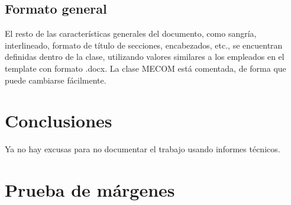 \documentclass[a4paper,11pt,twoside]{MECOM}
\begin{document}
    
    
    \subsection{Formato general}
    El resto de las caracter\'isticas generales del documento, como sangr\'ia, interlineado, formato de t\'itulo de secciones, encabezados, etc., se encuentran definidas dentro de la clase, utilizando valores similares a los empleados en el template con formato .docx. La clase MECOM est\'a comentada, de forma que puede cambiarse f\'acilmente.
    
    
    
    
    \section{Conclusiones}
    Ya no hay excusas para no documentar el trabajo usando informes t\'ecnicos.\\    
    
    
    
    
    
    
    \newpage
    \section{Prueba de m\'argenes} \blindtext[11]    
\end{document}
